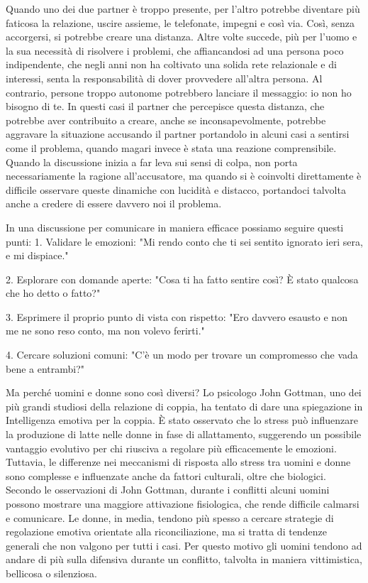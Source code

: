 \documentclass[12pt]{book} %
\begin{document}
Quando uno dei due partner è troppo presente, per l'altro potrebbe diventare più faticosa la relazione, uscire assieme, le telefonate, impegni e così via. Così, senza accorgersi, si potrebbe creare una distanza. Altre volte succede, più per
l'uomo e la sua necessità di risolvere i problemi, che affiancandosi ad una persona poco indipendente, che negli anni non ha coltivato una solida rete relazionale e di interessi, senta la responsabilità di dover provvedere all'altra persona. Al contrario, persone troppo autonome
potrebbero lanciare il messaggio: io non ho bisogno di te. In questi casi il partner che percepisce questa distanza, che potrebbe aver contribuito a creare, anche se inconsapevolmente, potrebbe aggravare la situazione accusando il partner portandolo in alcuni casi a sentirsi come il problema, quando magari invece è stata una reazione
comprensibile. Quando la discussione inizia a far leva sui sensi di colpa, non porta necessariamente la ragione all'accusatore, ma quando si è coinvolti direttamente è difficile osservare queste dinamiche con lucidità e distacco, portandoci talvolta anche a credere di essere davvero noi il problema.

In una discussione per comunicare in maniera efficace possiamo seguire questi punti:
1. Validare le emozioni:
"Mi rendo conto che ti sei sentito ignorato ieri sera, e mi dispiace."

2. Esplorare con domande aperte:
"Cosa ti ha fatto sentire così? È stato qualcosa che ho detto o fatto?"

3. Esprimere il proprio punto di vista con rispetto:
"Ero davvero esausto e non me ne sono reso conto, ma non volevo ferirti."

4. Cercare soluzioni comuni:
"C'è un modo per trovare un compromesso che vada bene a entrambi?"

Ma perché uomini e donne sono così diversi? Lo psicologo John Gottman, uno dei più grandi studiosi della relazione di
coppia, ha tentato di dare una spiegazione in Intelligenza emotiva per la
coppia. È stato osservato che lo stress può influenzare la produzione di latte nelle donne in fase di allattamento, suggerendo un possibile vantaggio evolutivo per chi riusciva a regolare più efficacemente le emozioni. Tuttavia, le differenze nei meccanismi di risposta allo stress tra uomini e donne sono complesse e influenzate anche da fattori culturali, oltre che biologici. 
Secondo le osservazioni di John Gottman, durante i conflitti alcuni uomini possono mostrare una maggiore attivazione fisiologica, che rende difficile calmarsi e comunicare. Le donne, in media, tendono più spesso a cercare strategie di regolazione emotiva orientate alla riconciliazione, ma si tratta di tendenze generali che non valgono per tutti i casi.
Per questo motivo gli uomini tendono ad andare di più sulla difensiva durante un conflitto, talvolta in maniera vittimistica,
bellicosa o silenziosa.
\end{document}
